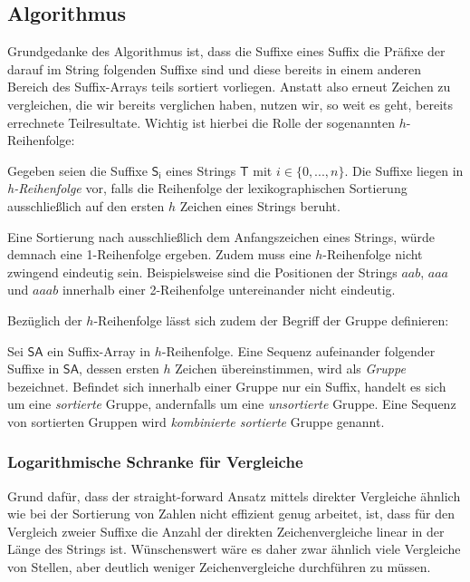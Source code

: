 \subsection{Algorithmus}
Grundgedanke des Algorithmus ist, dass die Suffixe eines Suffix die Präfixe der darauf im String folgenden Suffixe sind und diese bereits in einem anderen Bereich des Suffix-Arrays teils sortiert vorliegen. Anstatt also erneut Zeichen zu vergleichen, die wir bereits verglichen haben, nutzen wir, so weit es geht, bereits errechnete Teilresultate.
Wichtig ist hierbei die Rolle der sogenannten $h$-Reihenfolge:
\begin{definition}[$h$-Reihenfolge]
Gegeben seien die Suffixe $\mathsf{S_i}$ eines Strings $\mathsf{T}$ mit $i \in \{0,...,n\}$. Die Suffixe liegen in \textit{h-Reihenfolge} vor, falls die Reihenfolge der lexikographischen Sortierung ausschließlich auf den ersten $h$ Zeichen eines Strings beruht. 
\end{definition}
Eine Sortierung nach ausschließlich dem Anfangszeichen eines Strings, würde demnach eine 1-Reihenfolge ergeben. Zudem muss eine $h$-Reihenfolge nicht zwingend eindeutig sein. Beispielsweise sind die Positionen der Strings $aab$, $aaa$ und $aaab$ innerhalb einer 2-Reihenfolge untereinander nicht eindeutig. 

Bezüglich der $h$-Reihenfolge lässt sich zudem der Begriff der Gruppe definieren:
\begin{definition}[Gruppe]
Sei $\mathsf{SA}$ ein Suffix-Array in $h$-Reihenfolge. Eine Sequenz aufeinander folgender Suffixe in $\mathsf{SA}$, dessen ersten $h$ Zeichen übereinstimmen, wird als \textit{Gruppe} bezeichnet. Befindet sich innerhalb einer Gruppe nur ein Suffix, handelt es sich um eine \textit{sortierte} Gruppe, andernfalls um eine \textit{unsortierte} Gruppe. 
Eine Sequenz von sortierten Gruppen wird \textit{kombinierte sortierte} Gruppe genannt.
\end{definition}

\subsubsection{Logarithmische Schranke für Vergleiche}
Grund dafür, dass der straight-forward Ansatz mittels direkter Vergleiche ähnlich wie bei der Sortierung von Zahlen nicht effizient genug arbeitet, ist, dass für den Vergleich zweier Suffixe die Anzahl der direkten Zeichenvergleiche linear in der Länge des Strings ist. Wünschenswert wäre es daher zwar ähnlich viele Vergleiche von Stellen, aber deutlich weniger Zeichenvergleiche durchführen zu müssen.

